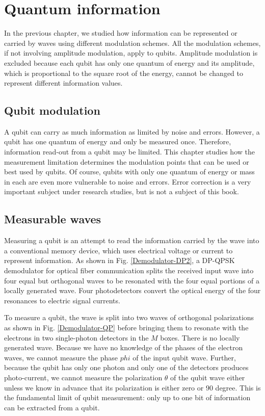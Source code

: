 \documentclass[oneside, letter, 12pt]{book}
\begin{document}
\chapter{Quantum information}\label{c-qinfo}
In the previous chapter, we studied how information can be represented or carried by waves using different modulation schemes. All the modulation schemes, if not involving amplitude modulation, apply to qubits. Amplitude modulation is excluded because each qubit has only one quantum of energy and its amplitude, which is proportional to the square root of the energy, cannot be changed to represent different information values.

\section{Qubit modulation}
A qubit can carry as much information as limited by noise and errors. However, a qubit has one quantum of energy and only be measured once. Therefore, information read-out from a qubit may be limited. This chapter studies how the measurement limitation determines the modulation points that can be used or best used by qubits. Of course, qubits with only one quantum of energy or mass in each are even more vulnerable to noise and errors. Error correction is a very important subject under research studies, but is not a subject of this book.

\section{Measurable waves}
Measuring a qubit is an attempt to read the information carried by the wave into a conventional memory device, which uses electrical voltage or current to represent information. As shown in Fig. \ref{Demodulator-DP2}, a DP-QPSK demodulator for optical fiber communication splits the received input wave into four equal but orthogonal waves to be resonated with the four equal portions of a locally generated wave. Four photodetectors convert the optical energy of the four resonances to electric signal currents.

To measure a qubit, the wave is split into two waves of orthogonal polarizations as shown in Fig. \ref{Demodulator-QP} before bringing them to resonate with the electrons in two single-photon detectors in the $M$ boxes. There is no locally generated wave. Because we have no knowledge of the phases of the electron waves, we cannot measure the phase $phi$ of the input qubit wave. Further, because the qubit has only one photon and only one of the detectors produces photo-current, we cannot measure the polarization $\theta$ of the qubit wave either unless we know in advance that its polarization is either zero or $90$ degree. This is the fundamental limit of qubit measurement: only up to one bit of information can be extracted from a qubit.
\end{document}
